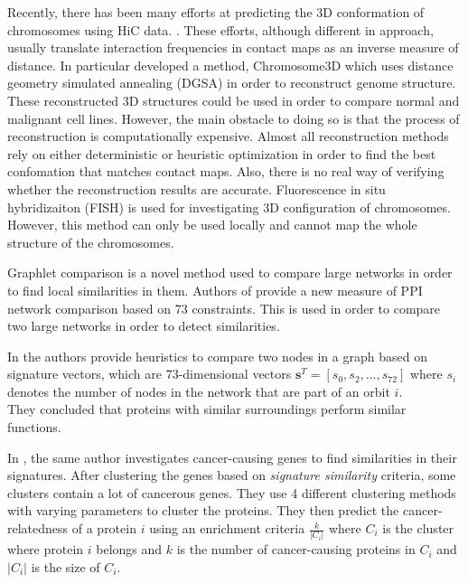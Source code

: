 \documentclass[a4,center,fleqn]{NAR}
\begin{document}
Recently, there has been many efforts at predicting the 3D conformation
of chromosomes using HiC data. 
\cite{noble2011three, rousseau2011three, hu2013bayesian, varoquaux2014statistical, trieu2014large, zhang20133d, lesne20143d, bau2011three, adhikari2016chromosome3d}.
These efforts, although different in
approach, usually translate 
interaction frequencies in contact maps as an inverse measure of 
distance. In particular \cite{adhikari2016chromosome3d} developed
a method, Chromosome3D which uses
distance geometry simulated annealing (DGSA) in order to
reconstruct genome structure. These reconstructed 3D 
structures could be used in order to compare normal and malignant
cell lines. However, the main obstacle to doing so is that the
process of reconstruction is computationally
expensive. Almost all reconstruction methods rely on either 
deterministic or heuristic optimization in order to find the best
confomation that matches contact maps. Also, there is no real 
way of verifying whether the reconstruction results are accurate.
Fluorescence in situ hybridizaiton
(FISH) is used for investigating 3D configuration of chromosomes.
\cite{gasser2002visualizing, lanctot2007dynamic, mateos2009spatially}
However, this method can only be used locally and cannot map
the whole structure of the chromosomes.

Graphlet comparison is a novel method used to compare 
large networks in order to
find local similarities in them.
Authors of \cite{prvzulj2007biological} 
provide a new measure of PPI
network comparison
based on 73 constraints. This is used in order to compare two large
networks in order to detect similarities.

In \cite{milenkoviae2008uncovering} the authors
 provide heuristics to compare two nodes in a graph
based on signature vectors, which are 73-dimensional vectors
$\mathbf{s}^T
= [s_0, s_2, ..., s_{72}]$ where $s_i$ denotes the number of nodes in
the network that are part of an orbit $i$. \\
They concluded that proteins with similar surroundings perform
similar functions.

In \cite{milenkovic2010cancer}, the same author investigates 
cancer-causing genes to find similarities in their signatures. After
clustering the genes based on \textit{signature similarity} criteria,
some clusters contain a lot of cancerous genes.
They use 4 different clustering methods with varying parameters to cluster
the proteins. They then predict the cancer-relatedness of a protein 
$i$ using
an enrichment criteria $\frac{k}{|C_i|}$ where $C_i$ is the cluster
where protein $i$ belongs and $k$ is the number of cancer-causing
proteins in $C_i$ and $|C_i|$ is the size of $C_i$.
\end{document}
